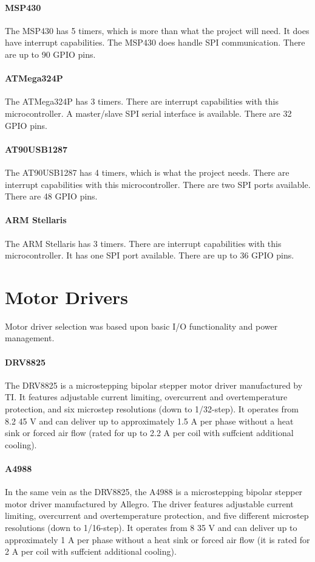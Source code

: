 \paragraph{MSP430} The MSP430 has 5 timers, which is more than what the project will need.
It does have interrupt capabilities.
The MSP430 does handle SPI communication. 
There are up to 90 GPIO pins.

\paragraph{ATMega324P} The ATMega324P has 3 timers.
There are interrupt capabilities with this microcontroller.
A master/slave SPI serial interface is available.
There are 32 GPIO pins.   

\paragraph{AT90USB1287} The AT90USB1287 has 4 timers, which is what the project needs.
There are interrupt capabilities with this microcontroller.
There are two SPI ports available. 
There are 48 GPIO pins.

\paragraph{ARM Stellaris} The ARM Stellaris has 3 timers.
There are interrupt capabilities with this microcontroller.
It has one SPI port available.
There are up to 36 GPIO pins.

\section{Motor Drivers}
Motor driver selection was based upon basic I/O functionality and power management.

\paragraph{DRV8825}
The DRV8825 is a microstepping bipolar stepper motor driver manufactured by TI.
It features adjustable current limiting, overcurrent and overtemperature protection, and six microstep resolutions (down to 1/32-step).
It operates from 8.2 45 V and can deliver up to approximately 1.5 A per phase without a heat sink or forced air ﬂow (rated for up to 2.2 A per coil with suffcient additional cooling).

\paragraph{A4988}
In the same vein as the DRV8825, the A4988 is a microstepping bipolar stepper motor driver manufactured by Allegro.
The driver features adjustable current limiting, overcurrent and overtemperature protection, and five different microstep resolutions (down to 1/16-step).
It operates from 8 35 V and can deliver up to approximately 1 A per phase without a heat sink or forced air ﬂow (it is rated for 2 A per coil with suffcient additional cooling).

